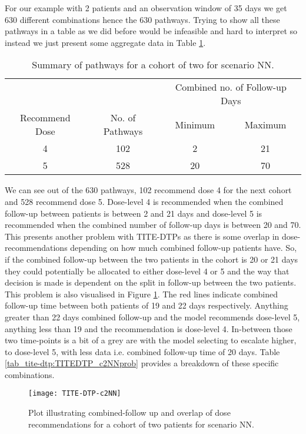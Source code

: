 For our example with 2 patients and an observation window of 35 days we get 630 different combinations hence the 630 pathways. Trying to show all these pathways in a table as we did before would be infeasible and hard to interpret so instead we just present some aggregate data in Table \ref{tab_tite-dtp:TITEDTP_c2NN}. 

\begin{table}[H]
	\centering
	\caption{Summary of pathways for a cohort of two for scenario NN. }
	\label{tab_tite-dtp:TITEDTP_c2NN}
	\begin{tabular}{cccc}
		\hline
		\multicolumn{1}{l}{} & \multicolumn{1}{l}{} & \multicolumn{2}{c}{Combined no. of Follow-up Days} \\ \cline{3-4} 
		Recommend Dose & No. of Pathways & Minimum & Maximum \\ \hline
		4              & 102             & 2       & 21      \\
		5              & 528             & 20      & 70      \\ \hline
	\end{tabular}
\end{table}

We can see out of the 630 pathways, 102 recommend dose 4 for the next cohort and 528 recommend dose 5. Dose-level 4 is recommended when the combined follow-up between patients is between 2 and 21 days and dose-level 5 is recommended when the combined number of follow-up days is between 20 and 70. This presents another problem with TITE-DTPs as there is some overlap in dose-recommendations depending on how much combined follow-up patients have. So, if the combined follow-up between the two patients in the cohort is 20 or 21 days they could potentially be allocated to either dose-level 4 or 5 and the way that decision is made is dependent on the split in follow-up between the two patients. This problem is also visualised in Figure \ref{fig_tite-dtp:c2NNprob}. The red lines indicate combined follow-up time between both patients of 19 and 22 days respectively. Anything greater than 22 days combined follow-up and the model recommends dose-level 5, anything less than 19 and the recommendation is dose-level 4. In-between those two time-points is a bit of a grey are with the model selecting to escalate higher, to dose-level 5, with less data i.e. combined follow-up time of 20 days. Table \ref{tab_tite-dtp:TITEDTP_c2NNprob} provides a breakdown of these specific combinations. 

\begin{figure}[h!]
	\centering
	\caption[Combined follow-up and dose decisions for a cohort of two.]{Plot illustrating combined-follow up and overlap of dose recommendations for a cohort of two patients for scenario NN.}
	\label{fig_tite-dtp:c2NNprob}
	\texttt{[image: TITE-DTP-c2NN]}
\end{figure}

